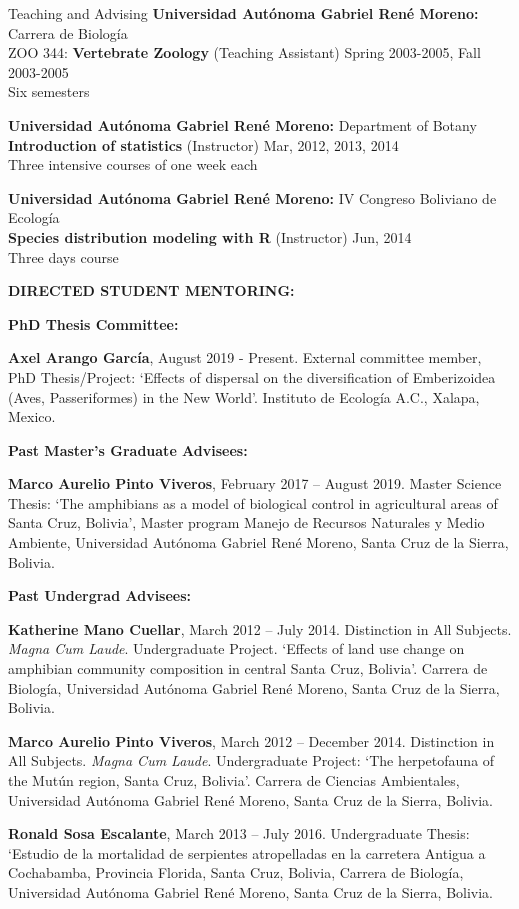 \documentclass{resume} %
\begin{document}
\begin{rSection}{Teaching and Advising}
{\bf Universidad Autónoma Gabriel René Moreno: }{Carrera de Biología } \\
ZOO 344: \textbf{Vertebrate Zoology} (Teaching Assistant) \hfill Spring 2003-2005, Fall 2003-2005 \\
{Six semesters}\smallskip 

{\bf Universidad Autónoma Gabriel René Moreno: }{Department of Botany } \\
\textbf{Introduction of statistics} (Instructor) \hfill Mar, 2012, 2013, 2014 \\
{Three intensive courses of one week each}\smallskip 

{\bf Universidad Autónoma Gabriel René Moreno: }{IV Congreso Boliviano de Ecología } \\
\textbf{Species distribution modeling with R} (Instructor) \hfill Jun, 2014 \\
{Three days course}\smallskip 

\textbf{DIRECTED STUDENT MENTORING:}

\textbf{PhD Thesis Committee:}

\textbf{Axel Arango García}, August 2019 - Present. External committee member, PhD Thesis/Project: `Effects of dispersal on the diversification of Emberizoidea (Aves, Passeriformes) in the New World'. Instituto de Ecología A.C., Xalapa, Mexico. 

\textbf{Past Master's Graduate Advisees:}

\textbf{Marco Aurelio Pinto Viveros}, February 2017 – August 2019. Master Science Thesis: `The amphibians as a model of biological control in agricultural areas of Santa Cruz, Bolivia', Master program Manejo de Recursos Naturales y Medio Ambiente, Universidad Autónoma Gabriel René Moreno, Santa Cruz de la Sierra, Bolivia.

\textbf{Past Undergrad Advisees:}

\textbf{Katherine Mano Cuellar}, March 2012 – July 2014. Distinction in All Subjects. {\em Magna Cum Laude}. Undergraduate Project. `Effects of land use change on amphibian community composition in central Santa Cruz, Bolivia'. Carrera de Biología, Universidad Autónoma Gabriel René Moreno, Santa Cruz de la Sierra, Bolivia.

\textbf{Marco Aurelio Pinto Viveros}, March 2012 – December 2014. Distinction in All Subjects. {\em Magna Cum Laude}. Undergraduate Project: `The herpetofauna of the Mutún region, Santa Cruz, Bolivia'. Carrera de Ciencias Ambientales, Universidad Autónoma Gabriel René Moreno, Santa Cruz de la Sierra, Bolivia.

\textbf{Ronald Sosa Escalante}, March 2013 – July 2016. Undergraduate Thesis: `Estudio de la mortalidad de serpientes atropelladas en la carretera Antigua a Cochabamba, Provincia Florida, Santa Cruz, Bolivia, Carrera de Biología, Universidad Autónoma Gabriel René Moreno, Santa Cruz de la Sierra, Bolivia.

\end{rSection}
\end{document}
